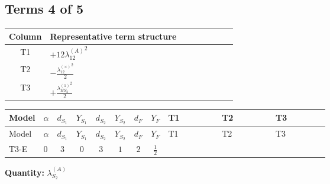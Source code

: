 \documentclass[8pt]{article}
\begin{document}
\begin{landscape}
\subsection*{Terms 4 of 5}
\begin{center}
\begin{tabular}{@{}c >{\raggedright\arraybackslash}p{0.82\linewidth}@{}}
\toprule
Column & Representative term structure \\
\midrule
T1 & \(\displaystyle +12 {\lambda_{12}^{(A)}}^2\) \\
\midrule
T2 & \(\displaystyle -\frac{{\lambda_{12}^{(\times)}}^2}{2}\) \\
\midrule
T3 & \(\displaystyle +\frac{{\lambda_{HS_2}^{(1)}}^2}{2}\) \\
\midrule
\bottomrule
\end{tabular}
\end{center}
\smallskip
\tiny
\begin{longtable}{@{}llcccccc >{\raggedright\arraybackslash}p{0.21\linewidth} >{\raggedright\arraybackslash}p{0.21\linewidth} >{\raggedright\arraybackslash}p{0.21\linewidth}@{}}
\toprule
Model & $\alpha$ & $d_{S_1}$ & $Y_{S_1}$ & $d_{S_2}$ & $Y_{S_2}$ & $d_F$ & $Y_F$ & T1 & T2 & T3 \\
\midrule
\endfirsthead
\toprule
Model & $\alpha$ & $d_{S_1}$ & $Y_{S_1}$ & $d_{S_2}$ & $Y_{S_2}$ & $d_F$ & $Y_F$ & T1 & T2 & T3 \\
\midrule
\endhead
T3-E & $0$ & $3$ & $0$ & $3$ & $1$ & $2$ & $\frac{1}{2}$ & \scriptsize\adjustbox{max width=\linewidth}{$\begin{gathered} +12 {\lambda_{12}^{(A)}}^2\end{gathered}$} & \scriptsize\adjustbox{max width=\linewidth}{$\begin{gathered} -\frac{{\lambda_{12}^{(\times)}}^2}{2}\end{gathered}$} & \scriptsize\adjustbox{max width=\linewidth}{$\begin{gathered} +\frac{{\lambda_{HS_2}^{(1)}}^2}{2}\end{gathered}$} \\
\midrule
\bottomrule
\end{longtable}
\clearpage
\noindent\textbf{Quantity: }$\lambda_{S_2}^{(A)}$\par\smallskip

\end{landscape}
\end{document}
